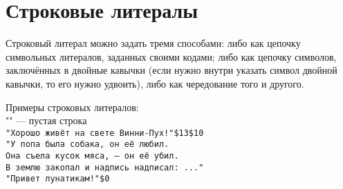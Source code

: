 \documentclass[10pt]{report}
\begin{document}
\section{Строковые литералы}
Строковый литерал можно задать тремя способами: либо как цепочку символьных литералов, заданных своими кодами; либо как цепочку символов, заключённых в двойные кавычки (если нужно внутри указать символ двойной кавычки, то его нужно удвоить), либо как чередование того и другого.

Примеры строковых литералов:\\[0.1mm]

\noindent"{}" --- пустая строка\\[0.1mm]

\noindent\texttt{"Хорошо живёт на свете Винни-Пух!"\$13\$10}\\[0.1mm]

\noindent\texttt{"У попа была собака, он её любил.\\
	Она съела кусок мяса, --- он её убил.\\
	В землю закопал и надпись надписал: ..."}\\[0.1mm]

\noindent\texttt{"Привет лунатикам!"\$0}
\end{document}
